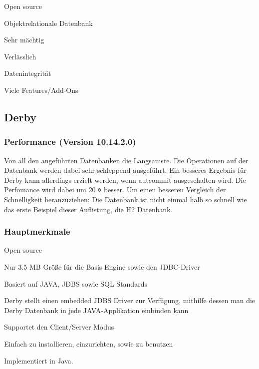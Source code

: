 \begin{compactitem}
    \item Open source
    \item Objektrelationale Datenbank         
    \item Sehr mächtig
    \item Verlässlich
    \item Datenintegrität
    \item Viele Features/Add-Ons
\end{compactitem}

\subsection{Derby}
\subsubsection{Performance (Version 10.14.2.0)}
Von all den angeführten Datenbanken die Langsamste. Die Operationen auf der Datenbank werden dabei sehr schleppend ausgeführt. Ein besseres Ergebnis für Derby kann allerdings erzielt werden, wenn autcommit ausgeschalten wird. Die Perfomance wird dabei um 20 \texttt{\%} besser. Um einen besseren Vergleich der Schnelligkeit heranzuziehen: Die Datenbank ist nicht einmal halb so schnell wie das erste Beispiel dieser Auflistung, die H2 Datenbank. 

\subsubsection{Hauptmerkmale}

\begin{compactitem}
    \item Open source
    \item Nur 3.5 MB Größe für die Basis Engine sowie den JDBC-Driver         
    \item Basiert auf JAVA, JDBS sowie SQL Standards
    \item Derby stellt einen embedded JDBS Driver zur Verfügung, mithilfe dessen man die Derby Datenbank in jede JAVA-Applikation einbinden kann
    \item Supportet den Client/Server Modus 
    \item Einfach zu installieren, einzurichten, sowie zu benutzen
\end{compactitem}

Implementiert in Java. 